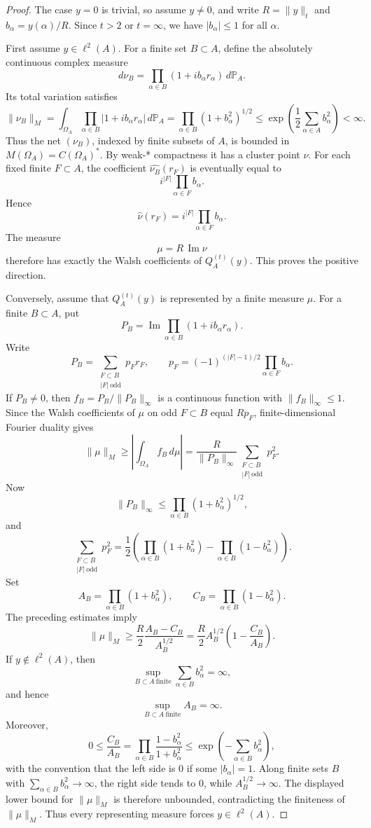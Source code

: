 \documentclass[11pt]{article}
\newcommand{\TV}[1]{\|#1\|_{M}}
\begin{document}
\begin{proof}
The case \(y=0\) is trivial, so assume \(y\ne0\), and write
\(R=\|y\|_t\) and \(b_\alpha=y(\alpha)/R\).  Since \(t>2\) or \(t=\infty\),
we have \(|b_\alpha|\le1\) for all \(\alpha\).

First assume \(y\in\ell^2(A)\).  For a finite set \(B\subset A\), define the
absolutely continuous complex measure
\[
  d\nu_B
  =
  \prod_{\alpha\in B}(1+i b_\alpha r_\alpha)\,d\mathbb P_A .
\]
Its total variation satisfies
\[
  \TV{\nu_B}
  =
  \int_{\Omega_A}\prod_{\alpha\in B}|1+i b_\alpha r_\alpha|\,d\mathbb P_A
  =
  \prod_{\alpha\in B}(1+b_\alpha^2)^{1/2}
  \le
  \exp\left(\frac12\sum_{\alpha\in A} b_\alpha^2\right)<\infty .
\]
Thus the net \((\nu_B)\), indexed by finite subsets of \(A\), is bounded in
\(M(\Omega_A)=C(\Omega_A)^*\).  By weak-* compactness it has a cluster point
\(\nu\).  For each fixed finite \(F\subset A\), the coefficient
\(\widehat{\nu_B}(r_F)\) is eventually equal to
\[
  i^{|F|}\prod_{\alpha\in F} b_\alpha .
\]
Hence
\[
  \widehat{\nu}(r_F)=i^{|F|}\prod_{\alpha\in F} b_\alpha .
\]
The measure
\[
  \mu=R\,\operatorname{Im}\nu
\]
therefore has exactly the Walsh coefficients of \(Q_A^{(t)}(y)\).  This proves
the positive direction.

Conversely, assume that \(Q_A^{(t)}(y)\) is represented by a finite measure
\(\mu\).  For a finite \(B\subset A\), put
\[
  P_B=\operatorname{Im}\prod_{\alpha\in B}(1+i b_\alpha r_\alpha).
\]
Write
\[
  P_B=\sum_{\substack{F\subset B\\ |F|\ \mathrm{odd}}}
       p_F r_F,
  \qquad
  p_F=(-1)^{(|F|-1)/2}\prod_{\alpha\in F}b_\alpha .
\]
If \(P_B\ne0\), then \(f_B=P_B/\|P_B\|_\infty\) is a continuous function with
\(\|f_B\|_\infty\le1\).  Since the Walsh coefficients of \(\mu\) on odd
\(F\subset B\) equal \(R p_F\), finite-dimensional Fourier duality gives
\[
  \TV{\mu}
  \ge
  \left|\int_{\Omega_A} f_B\,d\mu\right|
  =
  \frac{R}{\|P_B\|_\infty}
  \sum_{\substack{F\subset B\\ |F|\ \mathrm{odd}}} p_F^2 .
\]
Now
\[
  \|P_B\|_\infty
  \le
  \prod_{\alpha\in B}(1+b_\alpha^2)^{1/2},
\]
and
\[
  \sum_{\substack{F\subset B\\ |F|\ \mathrm{odd}}}p_F^2
  =
  \frac12\left(
    \prod_{\alpha\in B}(1+b_\alpha^2)
    -
    \prod_{\alpha\in B}(1-b_\alpha^2)
  \right).
\]
Set
\[
  A_B=\prod_{\alpha\in B}(1+b_\alpha^2),
  \qquad
  C_B=\prod_{\alpha\in B}(1-b_\alpha^2).
\]
The preceding estimates imply
\[
  \TV{\mu}
  \ge
  \frac{R}{2}\frac{A_B-C_B}{A_B^{1/2}}
  =
  \frac{R}{2} A_B^{1/2}\left(1-\frac{C_B}{A_B}\right).
\]
If \(y\notin\ell^2(A)\), then
\[
  \sup_{B\subset A\ \mathrm{finite}}\sum_{\alpha\in B}b_\alpha^2=\infty,
\]
and hence
\[
  \sup_{B\subset A\ \mathrm{finite}} A_B=\infty.
\]
Moreover,
\[
  0\le \frac{C_B}{A_B}
  =
  \prod_{\alpha\in B}\frac{1-b_\alpha^2}{1+b_\alpha^2}
  \le
  \exp\left(-\sum_{\alpha\in B}b_\alpha^2\right),
\]
with the convention that the left side is \(0\) if some \(|b_\alpha|=1\).
Along finite sets \(B\) with \(\sum_{\alpha\in B}b_\alpha^2\to\infty\), the
right side tends to \(0\), while \(A_B^{1/2}\to\infty\).  The displayed lower
bound for \(\TV{\mu}\) is therefore unbounded, contradicting the finiteness of
\(\TV{\mu}\).  Thus every representing measure forces \(y\in\ell^2(A)\).


\end{proof}
\end{document}
